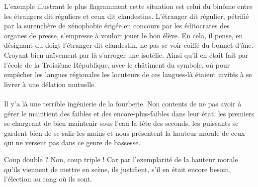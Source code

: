 L’exemple illustrant le plus flagramment cette situation est celui du binôme entre les étrangers dit réguliers et ceux dit clandestins. L’étranger dit régulier, pétrifié par la surenchère de xénophobie érigée en concours par les éditocrates des organes de presse, s’empresse à vouloir jouer le bon élève. En cela, il pense, en désignant du doigt l’étranger dit clandestin, ne pas se voir coiffé du bonnet d’âne. Croyant bien naïvement par là s’arroger une isotélie. Ainsi qu’il en était fait par l’école de la Troisième République, avec le châtiment du symbole, où pour empêcher les langues régionales les locuteurs de ces langues-là étaient invités à se livrer à une délation mutuelle.

\paragraph{}
Il y’a là une terrible ingénierie de la fourberie. Non contents de ne pas avoir à gérer le maintient des faibles et des encore-plus-faibles dans leur état, les premiers se chargeant de bien maintenir sous l’eau la tête des seconds, les puissants se gardent bien de se salir les mains et nous présentent la hauteur morale de ceux qui ne versent pas dans ce genre de bassesse.

Coup double ? Non, coup triple ! Car par l’exemplarité de la hauteur morale qu’ils viennent de mettre en scène, ils justifient, s’il en était encore besoin, l’élection au rang où ils sont.



